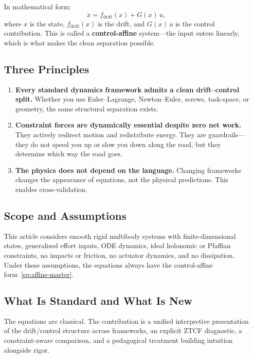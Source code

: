 \documentclass[11pt]{article}
\begin{document}
In mathematical form:
\begin{equation}\label{eq:affine-master}
\dot{x} = f_{\mathrm{drift}}(x) + G(x)\,u,
\end{equation}
where $x$ is the state, $f_{\mathrm{drift}}(x)$ is the drift, and $G(x)\,u$ is the control contribution. This is called a \textbf{control-affine} system---the input enters linearly, which is what makes the clean separation possible.

\subsection{Three Principles}

\begin{enumerate}
\item \textbf{Every standard dynamics framework admits a clean drift--control split.} Whether you use Euler--Lagrange, Newton--Euler, screws, task-space, or geometry, the same structural separation exists.

\item \textbf{Constraint forces are dynamically essential despite zero net work.} They actively redirect motion and redistribute energy. They are guardrails---they do not speed you up or slow you down along the road, but they determine which way the road goes.

\item \textbf{The physics does not depend on the language.} Changing frameworks changes the appearance of equations, not the physical predictions. This enables cross-validation.
\end{enumerate}

\subsection{Scope and Assumptions}

This article considers smooth rigid multibody systems with finite-dimensional states, generalized effort inputs, ODE dynamics, ideal holonomic or Pfaffian constraints, no impacts or friction, no actuator dynamics, and no dissipation. Under these assumptions, the equations always have the control-affine form~\eqref{eq:affine-master}.

\subsection{What Is Standard and What Is New}

The equations are classical. The contribution is a unified interpretive presentation of the drift/control structure across frameworks, an explicit ZTCF diagnostic, a constraint-aware comparison, and a pedagogical treatment building intuition alongside rigor.
\end{document}

